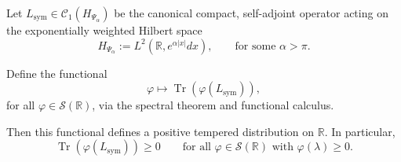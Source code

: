 \begin{lemma}
\label{sublem:trace_distribution_positive}
Let \( L_{\mathrm{sym}} \in \mathcal{C}_1(H_{\Psi_\alpha}) \) be the canonical compact, self-adjoint operator acting on the exponentially weighted Hilbert space
\[
H_{\Psi_\alpha} := L^2(\mathbb{R}, e^{\alpha |x|} dx), \qquad \text{for some } \alpha > \pi.
\]

Define the functional
\[
\varphi \mapsto \operatorname{Tr}(\varphi(L_{\mathrm{sym}})),
\]
for all \( \varphi \in \mathcal{S}(\mathbb{R}) \), via the spectral theorem and functional calculus.

Then this functional defines a positive tempered distribution on \( \mathbb{R} \). In particular,
\[
\operatorname{Tr}(\varphi(L_{\mathrm{sym}})) \ge 0 \qquad \text{for all } \varphi \in \mathcal{S}(\mathbb{R}) \text{ with } \varphi(\lambda) \ge 0.
\]
\end{lemma}
